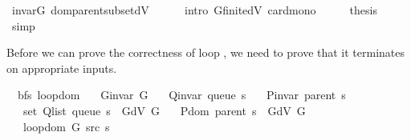 \begin{isabellebody}
\ invar{\isacharunderscore}{\kern0pt}G\ dom{\isacharunderscore}{\kern0pt}parent{\isacharunderscore}{\kern0pt}subset{\isacharunderscore}{\kern0pt}dV\isanewline
\ \ \ \ \isamarkupfalse%
\ {\isacharparenleft}{\kern0pt}intro\ G{\isachardot}{\kern0pt}finite{\isacharunderscore}{\kern0pt}dV\ card{\isacharunderscore}{\kern0pt}mono{\isacharparenright}{\kern0pt}\isanewline
\ \ \isamarkupfalse%
\ \isamarkupfalse%
\ {\isacharquery}{\kern0pt}thesis\isanewline
\ \ \ \ \isamarkupfalse%
\ simp\isanewline
{}\isamarkupfalse%
%
\endisatagproof
{\isafoldproof}%
%
\isadelimproof
%
\endisadelimproof
%
\isadelimdocument
%
\endisadelimdocument
%
\isatagdocument
%
\isamarkuptrue%
%
\endisatagdocument
{\isafolddocument}%
%
\isadelimdocument
%
\endisadelimdocument
%
\begin{isamarkuptext}%
Before we can prove the correctness of loop , we need to prove that it terminates on
appropriate inputs.%
\end{isamarkuptext}\isamarkuptrue%
\isamarkupfalse%
\ {\isacharparenleft}{\kern0pt}\ bfs{\isacharparenright}{\kern0pt}\ loop{\isacharunderscore}{\kern0pt}dom{\isacharcolon}{\kern0pt}\isanewline
\ \ \ {\isachardoublequoteopen}G{\isachardot}{\kern0pt}invar\ G{\isachardoublequoteclose}\isanewline
\ \ \ {\isachardoublequoteopen}Q{\isacharunderscore}{\kern0pt}invar\ {\isacharparenleft}{\kern0pt}queue\ s{\isacharparenright}{\kern0pt}{\isachardoublequoteclose}\isanewline
\ \ \ {\isachardoublequoteopen}P{\isacharunderscore}{\kern0pt}invar\ {\isacharparenleft}{\kern0pt}parent\ s{\isacharparenright}{\kern0pt}{\isachardoublequoteclose}\isanewline
\ \ \ {\isachardoublequoteopen}set\ {\isacharparenleft}{\kern0pt}Q{\isacharunderscore}{\kern0pt}list\ {\isacharparenleft}{\kern0pt}queue\ s{\isacharparenright}{\kern0pt}{\isacharparenright}{\kern0pt}\ {\isasymsubseteq}\ G{\isachardot}{\kern0pt}dV\ G{\isachardoublequoteclose}\isanewline
\ \ \ {\isachardoublequoteopen}P{\isachardot}{\kern0pt}dom\ {\isacharparenleft}{\kern0pt}parent\ s{\isacharparenright}{\kern0pt}\ {\isasymsubseteq}\ G{\isachardot}{\kern0pt}dV\ G{\isachardoublequoteclose}\isanewline
\ \ \ {\isachardoublequoteopen}loop{\isacharunderscore}{\kern0pt}dom\ {\isacharparenleft}{\kern0pt}G{\isacharcomma}{\kern0pt}\ src{\isacharcomma}{\kern0pt}\ s{\isacharparenright}{\kern0pt}{\isachardoublequoteclose}\isanewline

\end{isabellebody}

